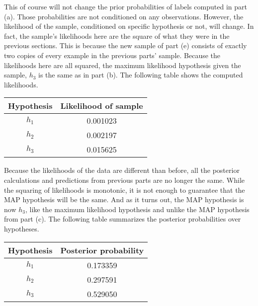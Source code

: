 \documentclass[12pt]{article}
\newcounter{alphaenum}
\newenvironment{abclist}
    { \begin{list}{(\alph{alphaenum}) ~} { \setcounter{alphaenum}{1} \usecounter{alphaenum} } }
    { \end{list} }
\begin{document}
\begin{abclist}
    This of course will not change the prior probabilities of labels computed in part (a).
    Those probabilities are not conditioned on any observations.
    However, the likelihood of the sample, conditioned on specific hypothesis or not, will change.
    In fact, the sample's likelihoods here are the square of what they were in the previous sections.
    This is because the new sample of part (e) consists of exactly two copies of every example in the previous parts' sample.
    Because the likelihoods here are all squared, the maximum likelihood hypothesis given the sample, $h_3$ is the same as in part (b).
    The following table shows the computed likelihoods.
    \begin{center}
        \begin{tabular}{|c|c|}
            \hline
            Hypothesis & Likelihood of sample \\
            \hline
            $h_1$ & 0.001023 \\
            $h_2$ & 0.002197 \\
            $h_3$ & 0.015625 \\
            \hline
        \end{tabular}
    \end{center}

    Because the likelihoods of the data are different than before,
    all the posterior calculations and predictions from previous parts are no longer the same.
    While the squaring of likelihoods is monotonic, it is not enough to guarantee that the MAP hypothesis will be the same.
    And as it turns out, the MAP hypothesis is now $h_3$, like the maximum likelihood hypothesis and unlike the MAP hypothesis from part (c).
    The following table summarizes the posterior probabilities over hypotheses.
    \begin{center}
        \begin{tabular}{|c|c|}
            \hline
            Hypothesis & Posterior probability \\
            \hline
            $h_1$ & 0.173359 \\
            $h_2$ & 0.297591 \\
            $h_3$ & 0.529050 \\
            \hline
        \end{tabular}
    \end{center}


\end{abclist}
\end{document}
